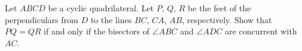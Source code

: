 Let $ABCD$ be a cyclic quadrilateral. Let $P$,  $Q$,  $R$ be the feet of the perpendiculars from $D$ to the lines $BC$,  $CA$,  $AB$,  respectively. Show that $PQ=QR$ if and only if the bisectors of $\angle ABC$ and $\angle ADC$ are concurrent with $AC$.